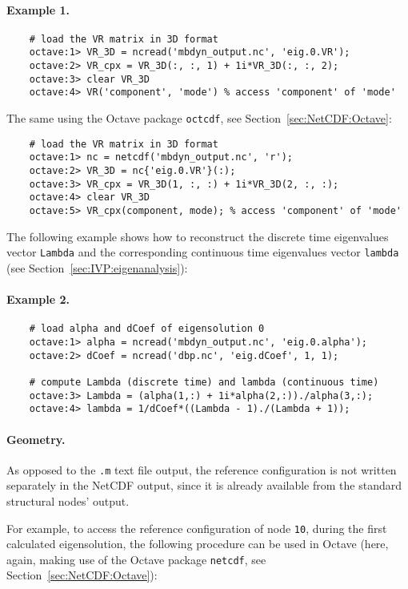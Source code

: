 \paragraph{Example 1.}
\begin{verbatim}
    # load the VR matrix in 3D format
    octave:1> VR_3D = ncread('mbdyn_output.nc', 'eig.0.VR');
    octave:2> VR_cpx = VR_3D(:, :, 1) + 1i*VR_3D(:, :, 2);
    octave:3> clear VR_3D
    octave:4> VR('component', 'mode') % access 'component' of 'mode'
\end{verbatim}
The same using the Octave package \texttt{octcdf}, see Section~\ref{sec:NetCDF:Octave}:
\begin{verbatim}
    # load the VR matrix in 3D format
    octave:1> nc = netcdf('mbdyn_output.nc', 'r');
    octave:2> VR_3D = nc{'eig.0.VR'}(:);
    octave:3> VR_cpx = VR_3D(1, :, :) + 1i*VR_3D(2, :, :);
    octave:4> clear VR_3D
    octave:5> VR_cpx(component, mode); % access 'component' of 'mode'
\end{verbatim}
The following example shows how to reconstruct the discrete time eigenvalues vector
\texttt{Lambda} and the corresponding continuous time eigenvalues vector
\texttt{lambda} (see Section~\ref{sec:IVP:eigenanalysis}):
\paragraph{Example 2.}
\begin{verbatim}
    # load alpha and dCoef of eigensolution 0
    octave:1> alpha = ncread('mbdyn_output.nc', 'eig.0.alpha');
    octave:2> dCoef = ncread('dbp.nc', 'eig.dCoef', 1, 1);
    
    # compute Lambda (discrete time) and lambda (continuous time)
    octave:3> Lambda = (alpha(1,:) + 1i*alpha(2,:))./alpha(3,:);
    octave:4> lambda = 1/dCoef*((Lambda - 1)./(Lambda + 1)); 
\end{verbatim}

\paragraph{Geometry.}
As opposed to the \texttt{.m} text file output, the reference configuration is not
written separately in the NetCDF output, since it is already available from the
standard structural nodes' output. 

For example, to access the reference configuration of node \texttt{10}, during the
first calculated eigensolution, the following procedure can be used
in Octave (here, again, making use of the Octave package \texttt{netcdf}, see 
Section~\ref{sec:NetCDF:Octave}):
